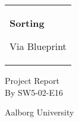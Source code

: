 %
\begin{titlepage}
  \addtolength{\hoffset}{0.5\evensidemargin-0.5\oddsidemargin} %
  \noindent%
  \begin{tabular}{@{}p{\textwidth}@{}}
    \vspace{0.2cm}
    \begin{center}
    \Huge{\textbf{Sorting}}
    \end{center}
    \begin{center}
      \Large{
        Via Blueprint%
      } %
    \end{center}
    \vspace{0.2cm}\\

  \end{tabular}
  \vspace{4 cm}
  \begin{center}
    {\large
      Project Report%
    }\\
    \vspace{0.2cm}
    {\Large
      By SW5-02-E16%
    }
  \end{center}
  \vfill
  \begin{center}
  Aalborg University\\
  \end{center}
\end{titlepage}
\clearpage
